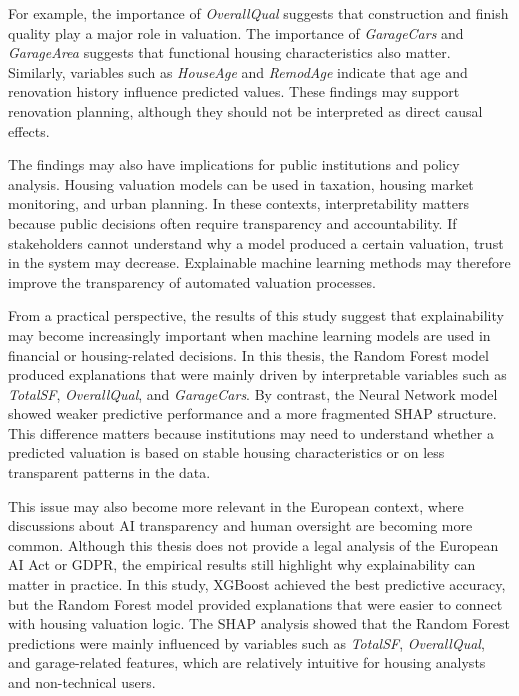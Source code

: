 \documentclass[12pt,a4paper,oneside,openany]{book}
\begin{document}
For example, the importance of \textit{OverallQual} suggests that construction and finish quality play a major role in valuation. The importance of \textit{GarageCars} and \textit{GarageArea} suggests that functional housing characteristics also matter. Similarly, variables such as \textit{HouseAge} and \textit{RemodAge} indicate that age and renovation history influence predicted values. These findings may support renovation planning, although they should not be interpreted as direct causal effects.

The findings may also have implications for public institutions and policy analysis. Housing valuation models can be used in taxation, housing market monitoring, and urban planning. In these contexts, interpretability matters because public decisions often require transparency and accountability. If stakeholders cannot understand why a model produced a certain valuation, trust in the system may decrease. Explainable machine learning methods may therefore improve the transparency of automated valuation processes.

From a practical perspective, the results of this study suggest that explainability may become increasingly important when machine learning models are used in financial or housing-related decisions. In this thesis, the Random Forest model produced explanations that were mainly driven by interpretable variables such as \textit{TotalSF}, \textit{OverallQual}, and \textit{GarageCars}. By contrast, the Neural Network model showed weaker predictive performance and a more fragmented SHAP structure. This difference matters because institutions may need to understand whether a predicted valuation is based on stable housing characteristics or on less transparent patterns in the data.

This issue may also become more relevant in the European context, where discussions about AI transparency and human oversight are becoming more common. Although this thesis does not provide a legal analysis of the European AI Act or GDPR, the empirical results still highlight why explainability can matter in practice. In this study, XGBoost achieved the best predictive accuracy, but the Random Forest model provided explanations that were easier to connect with housing valuation logic. The SHAP analysis showed that the Random Forest predictions were mainly influenced by variables such as \textit{TotalSF}, \textit{OverallQual}, and garage-related features, which are relatively intuitive for housing analysts and non-technical users.
\end{document}
